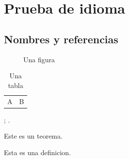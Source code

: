 \documentclass[es, font = none, mode = simple]{elegantbook-l3}
\begin{document}
\frontmatter
\tableofcontents

\mainmatter
\chapter{Prueba de idioma}
\section{Nombres y referencias}

\begin{figure}[htbp]
  \centering
  \fbox{\rule{0pt}{2cm}\rule{3cm}{0pt}}
  \caption{Una figura}\label{fig:language-test}
\end{figure}

\begin{table}[htbp]
  \centering
  \caption{Una tabla}\label{tab:language-test}
  \begin{tabular}{cc}
    A & B
  \end{tabular}
\end{table}

; .

\begin{theorem}[Ejemplo]
  Este es un teorema.
\end{theorem}

\begin{definition}
  Esta es una definicion.
\end{definition}
\end{document}
